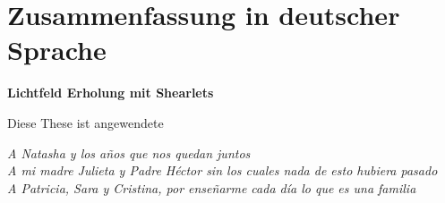 \documentclass[11pt, english, singlespacing, headsepline, ]{MastersDoctoralThesis}
\theoremstyle{definition}
\begin{document}
 
\clearpage\pagestyle{empty}
\section*{Zusammenfassung in deutscher Sprache}

\begin{center}
\textbf{Lichtfeld Erholung mit Shearlets}
\end{center}

Diese These ist angewendete

\clearpage\pagestyle{empty}
\begin{flushleft}
\textit{A Natasha y los años que nos quedan juntos\\
A mi madre Julieta y Padre Héctor sin los cuales nada de esto hubiera pasado\\
A Patricia, Sara y Cristina, por enseñarme cada día lo que es una familia}
\end{flushleft}
\end{document}
